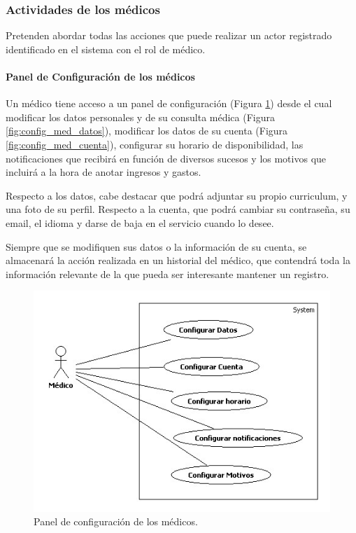 	
	
		\subsubsection{Actividades de los médicos} %
		\label{sec:actividades_de_los_medicos}
		
			Pretenden abordar todas las acciones que puede realizar un actor registrado identificado en el sistema con el rol de médico.
			\paragraph{Panel de Configuración de los médicos} %
			\label{par:panel_de_configuracion_de_los_medicos}
				Un médico tiene acceso a un panel de configuración (Figura \ref{fig:config_med}) desde el cual modificar los datos personales y de su consulta médica (Figura \ref{fig:config_med_datos}), modificar los datos de su cuenta (Figura \ref{fig:config_med_cuenta}), configurar su horario de disponibilidad, las notificaciones que recibirá en función de diversos sucesos y los motivos que incluirá a la hora de anotar ingresos y gastos.
				
				Respecto a los datos, cabe destacar que podrá adjuntar su propio curriculum, y una foto de su perfil. Respecto a la cuenta, que podrá cambiar su contraseña, su email, el idioma y darse de baja en el servicio cuando lo desee.
				
				Siempre que se modifiquen sus datos o la información de su cuenta, se almacenará la acción realizada en un historial del médico, que contendrá toda la información relevante de la que pueda ser interesante mantener un registro.
				\begin{figure}[H]
				  \centering
				    \includegraphics[width=12cm]{img/jpg/casos_uso/Configuracion_Medico.jpg}
				  \caption{Panel de configuración de los médicos.}
				  \label{fig:config_med}
				\end{figure}
				
